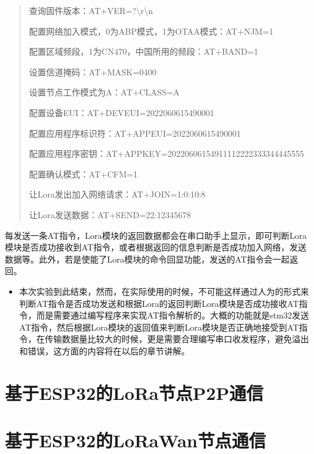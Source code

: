 \documentclass[a4paper,12pt,english]{sphinxmanual}
\begin{document}
{{\begin{quote}
\sphinxAtStartPar
查询固件版本：AT+VER=?\textbackslash{}r\textbackslash{}n

\sphinxAtStartPar
配置网络加入模式，0为ABP模式，1为OTAA模式：AT+NJM=1

\sphinxAtStartPar
配置区域频段，1为CN470，中国所用的频段：AT+BAND=1

\sphinxAtStartPar
设置信道掩码：AT+MASK=0400

\sphinxAtStartPar
设置节点工作模式为A：AT+CLASS=A

\sphinxAtStartPar
配置设备EUI：AT+DEVEUI=2022060615490001

\sphinxAtStartPar
配置应用程序标识符：AT+APPEUI=2022060615490001

\sphinxAtStartPar
配置应用程序密钥：AT+APPKEY=20220606154911112222333344445555

\sphinxAtStartPar
配置确认模式：AT+CFM=1

\sphinxAtStartPar
让Lora发出加入网络请求：AT+JOIN=1:0:10:8

\sphinxAtStartPar
让Lora发送数据：AT+SEND=22:12345678
\end{quote}

\sphinxAtStartPar
每发送一条AT指令，Lora模块的返回数据都会在串口助手上显示，即可判断Lora模块是否成功接收到AT指令，或者根据返回的信息判断是否成功加入网络，发送数据等。此外，若是使能了Lora模块的命令回显功能，发送的AT指令会一起返回。
\begin{itemize}
\item {} 
\sphinxAtStartPar
本次实验到此结束，然而，在实际使用的时候，不可能这样通过人为的形式来判断AT指令是否成功发送和根据Lora的返回判断Lora模块是否成功接收AT指令，而是需要通过编写程序来实现AT指令解析的。大概的功能就是stm32发送AT指令，然后根据Lora模块的返回值来判断Lora模块是否正确地接受到AT指令，在传输数据量比较大的时候，更是需要合理编写串口收发程序，避免溢出和错误，这方面的内容将在以后的章节讲解。

\end{itemize}

\sphinxstepscope


\section{基于ESP32的LoRa节点P2P通信}
\label{\detokenize{exp-lora/p2p-esp32:esp32lorap2p}}\label{\detokenize{exp-lora/p2p-esp32::doc}}
\sphinxstepscope


\section{基于ESP32的LoRaWan节点通信}
\label{\detokenize{exp-lora/lorawan-esp32:esp32lorawan}}\label{\detokenize{exp-lora/lorawan-esp32::doc}}

}}
\end{document}

